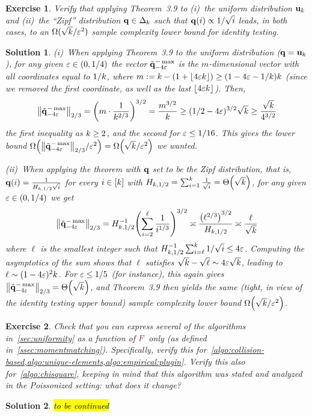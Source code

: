 \documentclass[biber]{nowfnt} %
\newtheorem{question}{Exercise}[chapter]
\newtheorem{solution}{Solution}[chapter]
\newcommand{\tbc}{\noindent\hl{\sc{}to be continued}\xspace}
\newcommand{\tbc}{}
\newcommand{\freq}{\textcolor{purple}{F}}
\newcommand{\freq}{F}
\begin{document}
\begin{question}\label{ex:2/3:lb:applications}
Verify that applying Theorem~3.9 to (i)~the uniform distribution $\mathbf{u}_k$ and (ii)~the ``Zipf'' distribution $\mathbf{q}\in\Delta_{k}$ such that $\mathbf{q}(i) \propto 1/\sqrt{i}$ leads, in both cases, to an $\Omega(\sqrt{k}/\varepsilon^2)$ sample complexity lower bound for identity testing.
\end{question}
\begin{solution}
(i)~When applying Theorem~3.9 to the uniform distribution (\ie $\mathbf{q}=\mathbf{u}_{ k } $), for any given $\varepsilon \in (0,1/4)$ the vector $\tilde{\mathbf{q}}^{-\max}_{-4\varepsilon}$ is the $m$-dimensional vector with all coordinates equal to $1/k$, where $m \eqdef \ab-(1+\flr{4\dst\ab}) \geq (1-4\dst-1/\ab)\ab$ (since we removed the first coordinate, as well as the last $\flr{4\dst\ab}$). Then,
\[
	\norm{\tilde{\q}^{-\max}_{-4\dst}}_{2/3} = \Paren{m \cdot \frac{1}{\ab^{2/3}}}^{3/2} = \frac{m^{3/2}}{\ab}
	\geq (1/2-4\dst)^{3/2} \sqrt{\ab} \geq \frac{\sqrt{\ab}}{4^{3/2}}
\]
the first inequality as $k \geq 2$, and the second for $\varepsilon \leq 1/16$. This gives the lower bound $\bigOmega{\norm{\tilde{\q}^{-\max}_{-4\dst}}_{2/3}/\dst^2} = \bigOmega{\sqrt{\ab}/\dst^2}$ we wanted.\medskip

(ii)~When applying the theorem with $\mathbf{q}$ set to be the Zipf distribution, that is, $\mathbf{q}(i) = \frac{1}{H_{k, 1/2}\sqrt{i}}$ for every $i\in [k]$ with $H_{\ab, 1/2}  = \sum_{i=1}^\ab \frac{1}{\sqrt{i}} = \bigTheta{\sqrt{\ab}}$, for any given $\varepsilon\in(0,1/4)$ we get
\[
	\norm{\tilde{\q}^{-\max}_{-4\dst}}_{2/3}
	= H_{\ab, 1/2}^{-1}  \Paren{ \sum_{i=2}^{\ell} \frac{1}{i^{1/3}} }^{3/2} \asymp \frac{\Paren{ \ell^{2/3} }^{3/2}}{H_{\ab, 1/2}}
	\asymp \frac{\ell}{\sqrt{\ab}}
\]
where $\ell$ is the smallest integer such that $H_{k, 1/2}^{-1}\sum_{i=\ell}^k 1/\sqrt{i} \leq 4\varepsilon$. Computing the asymptotics of the sum shows that $\ell$ satisfies $\sqrt{k}-\sqrt{\ell} \sim 4\varepsilon\sqrt{k}$, leading to $\ell \sim (1-4\varepsilon)^2 k$. For $\varepsilon \leq 1/5$ (for instance), this again gives $\norm{\tilde{\q}^{-\max}_{-4\dst}}_{2/3} = \bigTheta{\sqrt{\ab}}$, and Theorem~3.9 then yields the same (tight, in view of the identity testing upper bound) sample complexity lower bound $\bigOmega{\sqrt{\ab}/\dst^2}$.
\end{solution}

\begin{question}\label{exo:reexpress:algos:frequency:only}
Check that you can express several of the algorithms in~\cref{sec:uniformity} as a function of $\freq$ only (as defined in~\cref{ssec:momentmatching}). Specifically, verify this for~\cref{algo:collision-based,algo:unique-elements,algo:empirical:plugin}. Verify this also for~\cref{algo:chisquare}, keeping in mind that this algorithm was stated and analyzed in the Poissonized setting: what does it change?
\end{question}
\begin{solution}
\tbc
\end{solution}
\end{document}
